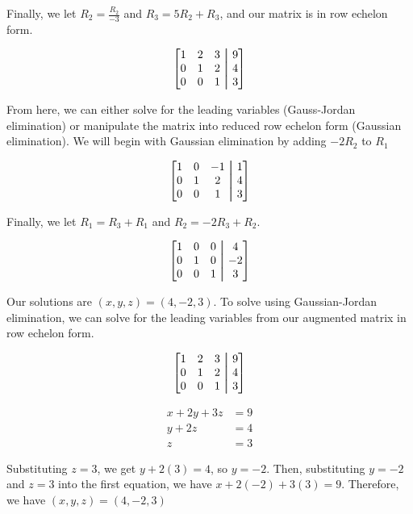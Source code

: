 \documentclass[11pt, letterpaper, twoside]{article}
\newcommand\aug{\fboxsep=-\fboxrule\!\!\!\fbox{\strut}\!\!\!} %
\begin{document}
\noindent Finally, we let \(R_2=\frac{R_2}{-3}\) and \(R_3=5R_2+R_3\), and our matrix is in row echelon form.

\[\begin{bmatrix}
1 & 2 & 3 & \aug & 9\\
0 & 1 & 2 & \aug & 4\\
0 & 0& 1 & \aug & 3
\end{bmatrix}\]

\noindent From here, we can either solve for the leading variables (Gauss-Jordan elimination) or manipulate the matrix into reduced row echelon form (Gaussian elimination). We will begin with Gaussian elimination by adding \(-2R_2\) to \(R_1\)

\[\begin{bmatrix}
1 & 0 & -1 & \aug & 1\\
0 & 1 & 2 & \aug & 4\\
0 & 0 & 1 & \aug & 3
\end{bmatrix}\]

\noindent Finally, we let \(R_1=R_3+R_1\) and \(R_2=-2R_3+R_2\).

\[\begin{bmatrix}
1 & 0 & 0 & \aug & 4\\
0 & 1 & 0 & \aug & -2\\
0 & 0 & 1 & \aug & 3
\end{bmatrix}\]

\noindent Our solutions are \(\boxed{(x, y, z)=(4, -2, 3)}\). To solve using Gaussian-Jordan elimination, we can solve for the leading variables from our augmented matrix in row echelon form.

\[\begin{bmatrix}
1 & 2 & 3 & \aug & 9\\
0 & 1 & 2 & \aug & 4\\
0 & 0& 1 & \aug & 3
\end{bmatrix}\]

\begin{align*}
x+2y+3z&=9\\
y+2z&=4\\
z&=3
\end{align*}

\noindent Substituting \(z=3\), we get \(y+2(3)=4\), so \(y=-2\). Then, substituting \(y=-2\) and \(z=3\) into the first equation, we have \(x+2(-2)+3(3)=9\). Therefore, we have \(\boxed{(x, y, z)=(4, -2, 3)}\)
\end{document}
